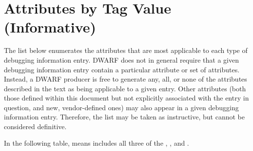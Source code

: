 \chapter[Attributes by Tag (Informative)]{Attributes by Tag Value (Informative)}
\label{chap:attributesbytagvalueinformative}

The list below enumerates the attributes that are
most applicable to each type of debugging information
entry. DWARF does not in general require that a given
debugging information entry contain a particular attribute
or set of attributes. Instead, a DWARF producer is free to
generate any, all, or none of the attributes described in the
text as being applicable to a given entry. Other attributes
(both those defined within this document but not explicitly
associated with the entry in question, and new, vendor-defined
ones) may also appear in a given debugging information
entry. Therefore, the list may be taken as instructive, but
cannot be considered definitive.  

In the following table,
means includes all three of the
,
, and 
.


